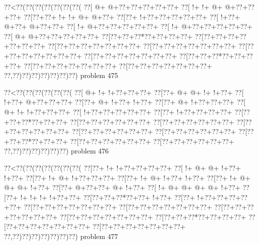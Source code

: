 \vbox{\vbox{\goo
\0??<\0??(\0??(\0??(\0??(\0??(\0??(\0??(
\0??[\- @+\- @+\0??+\0??+\0??+\0??+\0??+
\0??[\- !+\- !+\- @+\- @+\0??+\0??+\0??+
\0??[\0??+\0??+\- !+\- !+\- @+\- @+\0??+
\0??[\0??+\- !+\0??+\0??+\0??+\0??+\0??+
\0??[\- !+\0??+\- @+\0??+\- @+\0??+\0??+
\0??[\- !+\- @+\0??+\0??+\0??+\0??+\0??+
\0??[\- !+\- @+\0??+\0??+\0??+\0??+\0??+
\0??[\- @+\- @+\0??+\0??+\0??+\0??+\0??+
\0??[\0??+\0??+\0??*\0??+\0??+\0??+\0??+
\0??[\0??+\0??+\0??+\0??+\0??+\0??+\0??+
\0??[\0??+\0??+\0??+\0??+\0??+\0??+\0??+
\0??[\0??+\0??+\0??+\0??+\0??+\0??+\0??+
\0??[\0??+\0??+\0??+\0??+\0??+\0??+\0??+
\0??[\0??+\0??+\0??+\0??+\0??+\0??+\0??+
\0??[\0??+\0??+\0??*\0??+\0??+\0??+\0??+
\0??[\0??+\0??+\0??+\0??+\0??+\0??+\0??+
\0??[\0??+\0??+\0??+\0??+\0??+\0??+\0??+
\0??,\0??)\0??)\0??)\0??)\0??)\0??)\0??)
}
\hfil problem 475\hfil\break
}

\vbox{\vbox{\goo
\0??<\0??(\0??(\0??(\0??(\0??(\0??(
\0??[\- @+\- !+\- !+\0??+\0??+\0??+
\0??[\0??+\- @+\- @+\- !+\- !+\0??+
\0??[\- !+\0??+\- @+\0??+\0??+\0??+
\0??[\0??+\- @+\- !+\0??+\- !+\0??+
\0??[\0??+\- @+\- !+\0??+\0??+\0??+
\0??[\- @+\- !+\- !+\0??+\0??+\0??+
\0??[\- !+\0??+\0??+\0??+\0??+\0??+
\0??[\0??+\- !+\0??+\0??+\0??+\0??+
\0??[\0??+\0??+\0??*\0??+\0??+\0??+
\0??[\0??+\0??+\0??+\0??+\0??+\0??+
\0??[\0??+\0??+\0??+\0??+\0??+\0??+
\0??[\0??+\0??+\0??+\0??+\0??+\0??+
\0??[\0??+\0??+\0??+\0??+\0??+\0??+
\0??[\0??+\0??+\0??+\0??+\0??+\0??+
\0??[\0??+\0??+\0??*\0??+\0??+\0??+
\0??[\0??+\0??+\0??+\0??+\0??+\0??+
\0??[\0??+\0??+\0??+\0??+\0??+\0??+
\0??,\0??)\0??)\0??)\0??)\0??)\0??)
}
\hfil problem 476\hfil\break
}

\vbox{\vbox{\goo
\0??<\0??(\0??(\0??(\0??(\0??(\0??(\0??(
\0??[\0??+\- !+\- !+\0??+\0??+\0??+\0??+
\0??[\- !+\- @+\- @+\- !+\0??+\- !+\0??+
\0??[\0??+\- !+\- @+\- !+\0??+\0??+\0??+
\0??[\0??+\- !+\- @+\- !+\0??+\- !+\0??+
\0??[\0??+\- !+\- @+\- @+\- @+\- !+\0??+
\0??[\0??+\- @+\0??+\0??+\- @+\- !+\0??+
\0??[\- !+\- @+\- @+\- @+\- @+\- !+\0??+
\0??[\0??+\- !+\- !+\- !+\- !+\0??+\0??+
\0??[\0??+\0??+\0??*\0??+\0??+\- !+\0??+
\0??[\0??+\- !+\0??+\0??+\0??+\0??+\0??+
\0??[\0??+\0??+\0??+\0??+\0??+\0??+\0??+
\0??[\0??+\0??+\0??+\0??+\0??+\0??+\0??+
\0??[\0??+\0??+\0??+\0??+\0??+\0??+\0??+
\0??[\0??+\0??+\0??+\0??+\0??+\0??+\0??+
\0??[\0??+\0??+\0??*\0??+\0??+\0??+\0??+
\0??[\0??+\0??+\0??+\0??+\0??+\0??+\0??+
\0??[\0??+\0??+\0??+\0??+\0??+\0??+\0??+
\0??,\0??)\0??)\0??)\0??)\0??)\0??)\0??)
}
\hfil problem 477\hfil\break
}

